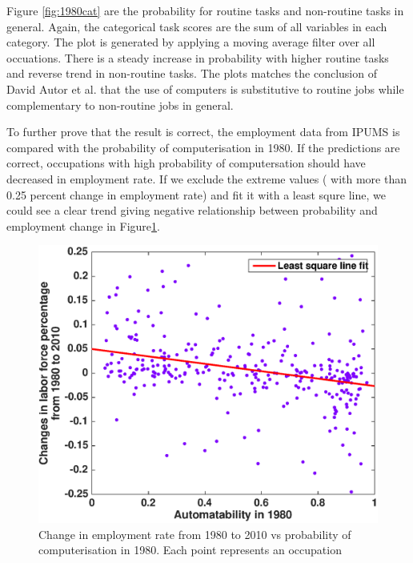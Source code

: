 \documentclass[11pt]{report}
\numberwithin{equation}{chapter}
\begin{document}
\begin{spacing}{2}
Figure \ref{fig:1980cat} are the probability for routine tasks and non-routine tasks in general. Again, the categorical task scores are the sum of all variables in each category. The plot is generated by applying a moving average filter over all occuations. There is a steady increase in probability with higher routine tasks and reverse trend in non-routine tasks. The plots matches the conclusion of David Autor et al.\cite{david2001skill} that the use of computers is substitutive to routine jobs while complementary to non-routine jobs in general. 

To further prove that the result is correct, the employment data from IPUMS\cite{IPUMS1990} is compared with the probability of computerisation in 1980. If the predictions are  correct, occupations with high probability of computersation should have decreased in employment rate\footnotemark . If we exclude the extreme values ( with more than 0.25 percent change in employment rate) and fit it with a least squre line, we could see a clear trend giving negative relationship between probability and employment change in Figure\ref{fig:labor_change}. 



 
\begin{figure}[htb]
\centering
\includegraphics[scale=0.7]{labor_change.eps}
\caption{Change in employment rate from 1980 to 2010 vs probability of computerisation in 1980. Each point represents an occupation }
\label{fig:labor_change}
\end{figure}


\end{spacing}
\end{document}
